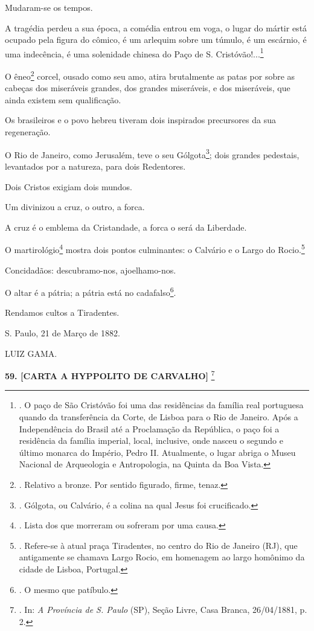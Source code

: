 Mudaram-se os tempos.

A tragédia perdeu a sua época, a comédia entrou em voga, o lugar do
mártir está ocupado pela figura do cômico, é um arlequim sobre um
túmulo, é um escárnio, é uma indecência, é uma solenidade chinesa do
Paço de S. Cristóvão!...\footnote{. O paço de São Cristóvão foi uma das
  residências da família real portuguesa quando da transferência da
  Corte, de Lisboa para o Rio de Janeiro. Após a Independência do Brasil
  até a Proclamação da República, o paço foi a residência da família
  imperial, local, inclusive, onde nasceu o segundo e último monarca do
  Império, Pedro II. Atualmente, o lugar abriga o Museu Nacional de
  Arqueologia e Antropologia, na Quinta da Boa Vista.}

O êneo\footnote{. Relativo a bronze. Por sentido figurado, firme, tenaz.}
corcel, ousado como seu amo, atira brutalmente as patas por sobre as
cabeças dos miseráveis grandes, dos grandes miseráveis, e dos
miseráveis, que ainda existem sem qualificação.

Os brasileiros e o povo hebreu tiveram dois inspirados precursores da
sua regeneração.

O Rio de Janeiro, como Jerusalém, teve o seu Gólgota\footnote{. Gólgota,
  ou Calvário, é a colina na qual Jesus foi crucificado.}; dois grandes
pedestais, levantados por a natureza, para dois Redentores.

Dois Cristos exigiam dois mundos.

Um divinizou a cruz, o outro, a forca.

A cruz é o emblema da Cristandade, a forca o será da Liberdade.

O martirológio\footnote{. Lista dos que morreram ou sofreram por uma
  causa.} mostra dois pontos culminantes: o Calvário e o Largo do
Rocio.\footnote{. Refere-se à atual praça Tiradentes, no centro do Rio
  de Janeiro (RJ), que antigamente se chamava Largo Rocio, em homenagem
  ao largo homônimo da cidade de Lisboa, Portugal.}

Concidadãos: descubramo-nos, ajoelhamo-nos.

O altar é a pátria; a pátria está no cadafalso\footnote{. O mesmo que
  patíbulo.}.

Rendamos cultos a Tiradentes.

S. Paulo, 21 de Março de 1882.

LUIZ GAMA.

\textbf{59. {[}CARTA A HYPPOLITO DE CARVALHO{]}} \footnote{. In: \emph{A
  Província de S. Paulo} (SP), Seção Livre, Casa Branca, 26/04/1881, p.
  2.}

